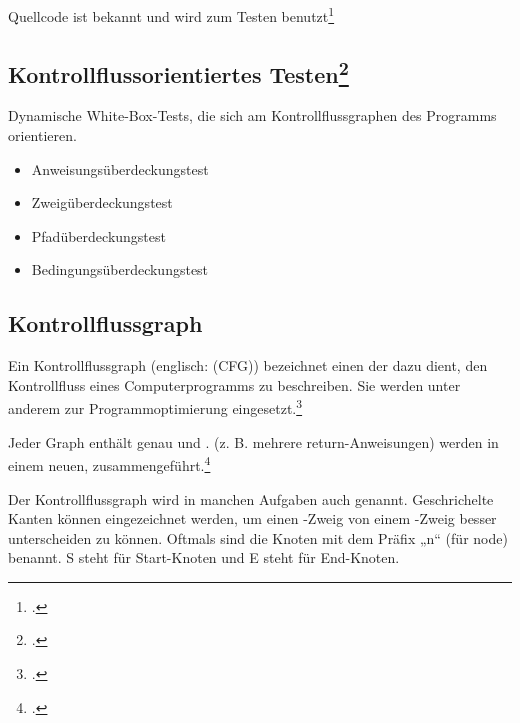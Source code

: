 \documentclass{lehramt-informatik-haupt}
\begin{document}
\begin{quellen}
\item \cite{wiki:white-box-test}
\item \cite[Seite 199-246]{hoffmann}
\end{quellen}

Quellcode ist bekannt und wird
zum Testen benutzt\footcite[Seite 32]{sosy:fs:5}

%

\subsection{Kontrollflussorientiertes Testen\footcite[Seite 34]{sosy:fs:5}}

\begin{quellen}
\item \cite{wiki:kontrollfluss-test}
\item \cite[Kapitel 8.6.3 „Methoden zur Testfallermittlung“, Seite 251-252]{schneider}
\end{quellen}

Dynamische White-Box-Tests, die sich am Kontrollflussgraphen des
Programms orientieren.

\begin{itemize}
\item Anweisungsüberdeckungstest
\item Zweigüberdeckungstest
\item Pfadüberdeckungstest
\item Bedingungsüberdeckungstest
\end{itemize}

%

\subsection{Kontrollflussgraph}

Ein Kontrollflussgraph (englisch:  (CFG))
bezeichnet einen  der dazu dient, den
Kontrollfluss eines Computerprogramms zu beschreiben. Sie werden unter
anderem zur Programmoptimierung
eingesetzt.\footcite{wiki:kontrollflussgraph}

Jeder Graph enthält genau  und .  (z. B. mehrere
return-Anweisungen) werden in einem neuen,  zusammengeführt.\footcite[Seite
203]{hoffmann}

Der Kontrollflussgraph wird in manchen Aufgaben auch
 genannt. Geschrichelte Kanten können
eingezeichnet werden, um einen -Zweig von einem
-Zweig besser unterscheiden zu können. Oftmals sind die
Knoten mit dem Präfix „n“ (für node) benannt. S steht für Start-Knoten
und E steht für End-Knoten.
\end{document}
